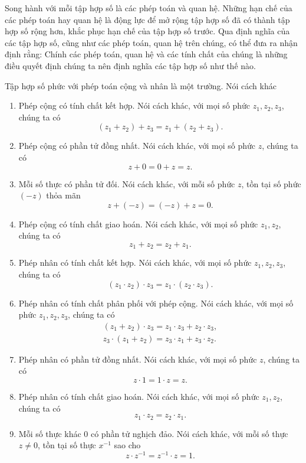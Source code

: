 Song hành với mỗi tập hợp số là các phép toán và quan hệ. Những hạn chế của các phép toán hay quan hệ là động lực để mở rộng tập hợp số đã có thành tập hợp số rộng hơn, khắc phục hạn chế của tập hợp số trước. Qua định nghĩa của các tập hợp số, cũng như các phép toán, quan hệ trên chúng, có thể đưa ra nhận định rằng: Chính các phép toán, quan hệ và các tính chất của chúng là những điều quyết định chúng ta nên định nghĩa các tập hợp số như thế nào.

\begin{theorem}
	Tập hợp số phức với phép toán cộng và nhân là một trường. Nói cách khác
	\begin{enumerate}[label={(F\arabic*)}]
		\item Phép cộng có tính chất kết hợp. Nói cách khác, với mọi số phức $z_{1}, z_{2}, z_{3}$, chúng ta có
		      \[
			      (z_{1} + z_{2}) + z_{3} = z_{1} + (z_{2} + z_{3}).
		      \]
		\item Phép cộng có phần tử đồng nhất. Nói cách khác, với mọi số phức $z$, chúng ta có
		      \[
			      z + 0 = 0 + z = z.
		      \]
		\item Mỗi số thực có phần tử đối. Nói cách khác, với mỗi số phức $z$, tồn tại số phức $(-z)$ thỏa mãn
		      \[
			      z + (-z) = (-z) + z = 0.
		      \]
		\item Phép cộng có tính chất giao hoán. Nói cách khác, với mọi số phức $z_{1}, z_{2}$, chúng ta có
		      \[
			      z_{1} + z_{2} = z_{2} + z_{1}.
		      \]
		\item Phép nhân có tính chất kết hợp. Nói cách khác, với mọi số phức $z_{1}, z_{2}, z_{3}$, chúng ta có
		      \[
			      (z_{1} \cdot z_{2}) \cdot z_{3} = z_{1} \cdot (z_{2} \cdot z_{3}).
		      \]
		\item Phép nhân có tính chất phân phối với phép cộng. Nói cách khác, với mọi số phức $z_{1}, z_{2}, z_{3}$, chúng ta có
		      \[
			      \begin{split}
				      (z_{1} + z_{2})\cdot z_{3} = z_{1}\cdot z_{3} + z_{2}\cdot z_{3}, \\
				      z_{3}\cdot (z_{1} + z_{2}) = z_{3}\cdot z_{1} + z_{3}\cdot z_{2}.
			      \end{split}
		      \]

		\item Phép nhân có phần tử đồng nhất. Nói cách khác, với mọi số phức $z$, chúng ta có
		      \[
			      z \cdot 1 = 1 \cdot z = z.
		      \]
		\item Phép nhân có tính chất giao hoán. Nói cách khác, với mọi số phức $z_{1}, z_{2}$, chúng ta có
		      \[
			      z_{1}\cdot z_{2} = z_{2}\cdot z_{1}.
		      \]
		\item Mỗi số thực khác $0$ có phần tử nghịch đảo. Nói cách khác, với mỗi số thực $z\ne 0$, tồn tại số thực $x^{-1}$ sao cho
		      \[
			      z\cdot z^{-1} = z^{-1}\cdot z = 1.
		      \]
	\end{enumerate}
\end{theorem}


